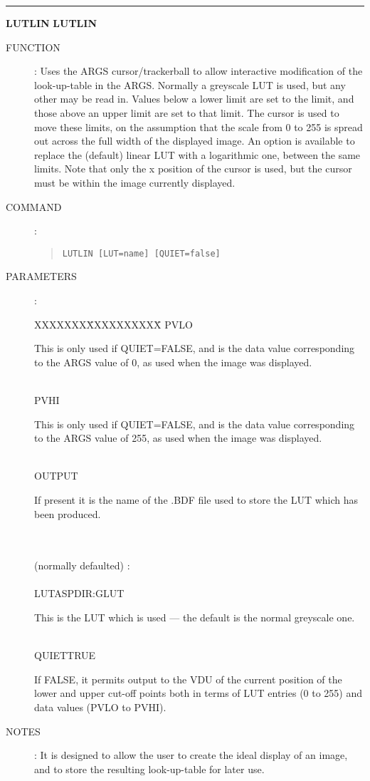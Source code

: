 \goodbreak
\rule{\textwidth}{0.3mm}
{\Large {\bf LUTLIN} \hfill {\bf LUTLIN}}
\begin{description}
\item [FUNCTION]:
Uses the ARGS cursor/trackerball to allow interactive modification of the
look-up-table in the ARGS.
Normally a greyscale LUT is used, but any other may be read in.
Values below a lower limit are set to the limit, and those above an upper limit
are set to that limit.
The cursor is used to move these limits, on the assumption that the scale from 0
to 255 is spread out across the full width of the displayed image.
An option is available to replace the (default) linear LUT with a logarithmic
one, between the same limits.
Note that only the x position of the cursor is used, but the cursor must be
within the image currently displayed.
\item [COMMAND]:
\begin{quote}
{\tt LUTLIN [LUT=name] [QUIET=false]}
\end{quote}
\item [PARAMETERS] :
\begin{tabbing}
XXXXXXX\=XXXXXXXXXX\=\kill
PVLO\>\begin{minipage}[t]{100mm}
This is only used if QUIET=FALSE, and is the data value corresponding to the
ARGS value of 0, as used when the image was displayed.
\end{minipage}\\
PVHI\>\begin{minipage}[t]{100mm}
This is only used if QUIET=FALSE, and is the data value corresponding to the
ARGS value of 255, as used when the image was displayed.
\end{minipage}\\
OUTPUT\>\>\begin{minipage}[t]{100mm}
If present it is the name of the .BDF file used to store the LUT which has been
produced.
\end{minipage}\\
\\
(normally defaulted) :\\
\\
LUT\>ASPDIR:GLUT\>\begin{minipage}[t]{100mm}
This is the LUT which is used --- the default is the normal greyscale one.
\end{minipage}\\
QUIET\>TRUE\>\begin{minipage}[t]{100mm}
If FALSE, it permits output to the VDU of the current position of the lower and
upper cut-off points both in terms of LUT entries (0 to 255) and data values
(PVLO to PVHI).
\end{minipage}
\end{tabbing}
\item [NOTES]:
It is designed to allow the user to create the ideal display of an image, and
to store the resulting look-up-table for later use.


\end{description}
